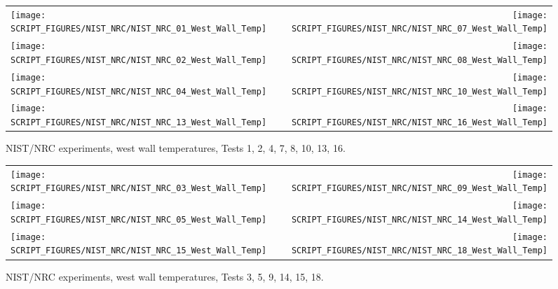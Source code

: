 \begin{figure}[p]
\begin{tabular*}{\textwidth}{l@{\extracolsep{\fill}}r}
\texttt{[image: SCRIPT\_FIGURES/NIST\_NRC/NIST\_NRC\_01\_West\_Wall\_Temp]} &
\texttt{[image: SCRIPT\_FIGURES/NIST\_NRC/NIST\_NRC\_07\_West\_Wall\_Temp]} \\
\texttt{[image: SCRIPT\_FIGURES/NIST\_NRC/NIST\_NRC\_02\_West\_Wall\_Temp]} &
\texttt{[image: SCRIPT\_FIGURES/NIST\_NRC/NIST\_NRC\_08\_West\_Wall\_Temp]} \\
\texttt{[image: SCRIPT\_FIGURES/NIST\_NRC/NIST\_NRC\_04\_West\_Wall\_Temp]} &
\texttt{[image: SCRIPT\_FIGURES/NIST\_NRC/NIST\_NRC\_10\_West\_Wall\_Temp]} \\
\texttt{[image: SCRIPT\_FIGURES/NIST\_NRC/NIST\_NRC\_13\_West\_Wall\_Temp]} &
\texttt{[image: SCRIPT\_FIGURES/NIST\_NRC/NIST\_NRC\_16\_West\_Wall\_Temp]}
\end{tabular*}
\caption{NIST/NRC experiments, west wall temperatures, Tests 1, 2, 4, 7, 8, 10, 13, 16.}
\label{NIST_NRC_West_Wall_Temp_Closed}
\end{figure}

\begin{figure}[p]
\begin{tabular*}{\textwidth}{l@{\extracolsep{\fill}}r}
\texttt{[image: SCRIPT\_FIGURES/NIST\_NRC/NIST\_NRC\_03\_West\_Wall\_Temp]} &
\texttt{[image: SCRIPT\_FIGURES/NIST\_NRC/NIST\_NRC\_09\_West\_Wall\_Temp]} \\
\texttt{[image: SCRIPT\_FIGURES/NIST\_NRC/NIST\_NRC\_05\_West\_Wall\_Temp]} &
\texttt{[image: SCRIPT\_FIGURES/NIST\_NRC/NIST\_NRC\_14\_West\_Wall\_Temp]} \\
\texttt{[image: SCRIPT\_FIGURES/NIST\_NRC/NIST\_NRC\_15\_West\_Wall\_Temp]} &
\texttt{[image: SCRIPT\_FIGURES/NIST\_NRC/NIST\_NRC\_18\_West\_Wall\_Temp]}
\end{tabular*}
\caption{NIST/NRC experiments, west wall temperatures, Tests 3, 5, 9, 14, 15, 18.}
\label{NIST_NRC_West_Wall_Temp_Open}
\end{figure}

